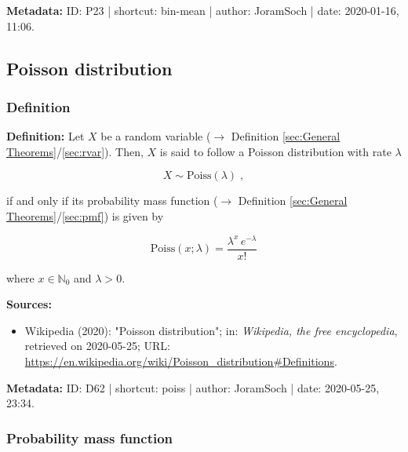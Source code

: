\documentclass[a4paper,12pt,twoside]{book}
\begin{document}
\vspace{1em}
\textbf{Metadata:} ID: P23 | shortcut: bin-mean | author: JoramSoch | date: 2020-01-16, 11:06.
\vspace{1em}



\subsection{Poisson distribution}

\subsubsection[\textit{Definition}]{Definition} \label{sec:poiss}
\setcounter{equation}{0}

\textbf{Definition:} Let $X$ be a random variable ($\rightarrow$ Definition \ref{sec:General Theorems}/\ref{sec:rvar}). Then, $X$ is said to follow a Poisson distribution with rate $\lambda$

\begin{equation} \label{eq:poiss-poiss}
X \sim \mathrm{Poiss}(\lambda) \; ,
\end{equation}

if and only if its probability mass function ($\rightarrow$ Definition \ref{sec:General Theorems}/\ref{sec:pmf}) is given by

\begin{equation} \label{eq:poiss-poiss-pmf}
\mathrm{Poiss}(x; \lambda) = \frac{\lambda^x \, e^{-\lambda}}{x!}
\end{equation}

where $x \in \mathbb{N}_0$ and $\lambda > 0$.


\vspace{1em}
\textbf{Sources:}
\begin{itemize}
\item Wikipedia (2020): "Poisson distribution"; in: \textit{Wikipedia, the free encyclopedia}, retrieved on 2020-05-25; URL: \url{https://en.wikipedia.org/wiki/Poisson_distribution#Definitions}.
\end{itemize}


\vspace{1em}
\textbf{Metadata:} ID: D62 | shortcut: poiss | author: JoramSoch | date: 2020-05-25, 23:34.
\vspace{1em}



\subsubsection[\textbf{Probability mass function}]{Probability mass function} \label{sec:poiss-pmf}
\setcounter{equation}{0}
\end{document}
